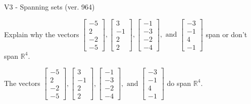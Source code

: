 \begin{exercise}
  \begin{exerciseTitle}V3 - Spanning sets (ver. 964)\end{exerciseTitle}
  \begin{exerciseStatement}
    Explain why the vectors \(\left[\begin{array}{r}
-5 \\
2 \\
-2 \\
-5
\end{array}\right] , \left[\begin{array}{r}
3 \\
-1 \\
2 \\
2
\end{array}\right] , \left[\begin{array}{r}
-1 \\
-3 \\
-2 \\
-4
\end{array}\right] , \text{ and } \left[\begin{array}{r}
-3 \\
-1 \\
4 \\
-1
\end{array}\right]\) span or don't span \(\mathbb{R}^4\). 
	


  \end{exerciseStatement}
  \begin{exerciseAnswer}
   The vectors \(\left[\begin{array}{r}
-5 \\
2 \\
-2 \\
-5
\end{array}\right] , \left[\begin{array}{r}
3 \\
-1 \\
2 \\
2
\end{array}\right] , \left[\begin{array}{r}
-1 \\
-3 \\
-2 \\
-4
\end{array}\right] , \text{ and } \left[\begin{array}{r}
-3 \\
-1 \\
4 \\
-1
\end{array}\right]\) 
  	 do  
	span \(\mathbb{R}^4\).
  


  \end{exerciseAnswer}
\end{exercise}